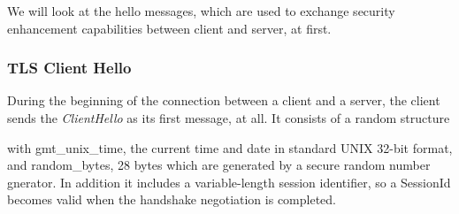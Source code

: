 \documentclass[sigconf, screen]{acmart}
\begin{document}

We will look at the hello messages, which are used to exchange security enhancement capabilities between client and server, at first.
\subsubsection{TLS Client Hello}
\label{sss:tlsclienthello}
During the beginning of the connection between a client and a server, the client sends the \textit{ClientHello} as its first message, at all. It consists of a random structure 

with gmt\_unix\_time, the current time and date in standard UNIX 32-bit format, and random\_bytes, 28 bytes which are generated by a secure random number gnerator. In addition it includes a variable-length session identifier, so a SessionId becomes valid when the handshake negotiation is completed.
\end{document}
